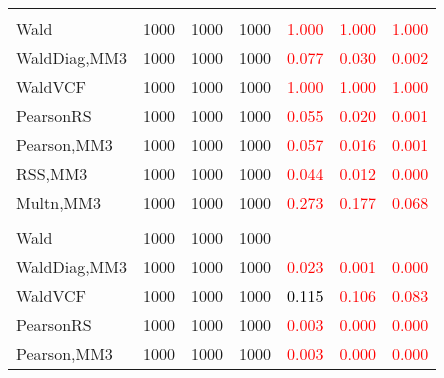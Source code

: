 \documentclass[
]{article}
\begin{document}
\begin{table}[H]
{\begin{tabular}[t]{lrrrrrr}
\addlinespace[0.3em]
\multicolumn{7}{l}{\textbf{1F 8V}}\\
\hspace{1em}Wald & 1000 & 1000 & 1000 & \textcolor{red}{1.000} & \textcolor{red}{1.000} & \vphantom{1} \textcolor{red}{1.000}\\
\hspace{1em}WaldDiag,MM3 & 1000 & 1000 & 1000 & \textcolor{red}{0.077} & \textcolor{red}{0.030} & \textcolor{red}{0.002}\\
\hspace{1em}WaldVCF & 1000 & 1000 & 1000 & \textcolor{red}{1.000} & \textcolor{red}{1.000} & \textcolor{red}{1.000}\\
\hspace{1em}PearsonRS & 1000 & 1000 & 1000 & \textcolor{red}{0.055} & \textcolor{red}{0.020} & \textcolor{red}{0.001}\\
\hspace{1em}Pearson,MM3 & 1000 & 1000 & 1000 & \textcolor{red}{0.057} & \textcolor{red}{0.016} & \textcolor{red}{0.001}\\
\hspace{1em}RSS,MM3 & 1000 & 1000 & 1000 & \textcolor{red}{0.044} & \textcolor{red}{0.012} & \textcolor{red}{0.000}\\
\hspace{1em}Multn,MM3 & 1000 & 1000 & 1000 & \textcolor{red}{0.273} & \textcolor{red}{0.177} & \textcolor{red}{0.068}\\
\addlinespace[0.3em]
\multicolumn{7}{l}{\textbf{1F 15V}}\\
\hspace{1em}Wald & 1000 & 1000 & 1000 & \textcolor{black}{} & \textcolor{black}{} & \vphantom{1} \textcolor{black}{}\\
\hspace{1em}WaldDiag,MM3 & 1000 & 1000 & 1000 & \textcolor{red}{0.023} & \textcolor{red}{0.001} & \textcolor{red}{0.000}\\
\hspace{1em}WaldVCF & 1000 & 1000 & 1000 & \textcolor{black}{0.115} & \textcolor{red}{0.106} & \textcolor{red}{0.083}\\
\hspace{1em}PearsonRS & 1000 & 1000 & 1000 & \textcolor{red}{0.003} & \textcolor{red}{0.000} & \textcolor{red}{0.000}\\
\hspace{1em}Pearson,MM3 & 1000 & 1000 & 1000 & \textcolor{red}{0.003} & \textcolor{red}{0.000} & \textcolor{red}{0.000}\\

\end{tabular}}
\end{table}
\end{document}
